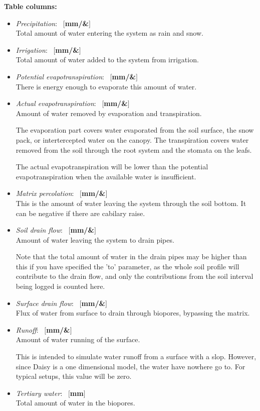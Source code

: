 \documentclass[a4paper]{article}
\begin{document}
\textbf{Table columns:}\begin{itemize}
\item \textit{Precipitation}: ~$[$\textbf{mm/\&}$]$\\
Total amount of water entering the system as rain and snow.
\item \textit{Irrigation}: ~$[$\textbf{mm/\&}$]$\\
Total amount of water added to the system from irrigation.
\item \textit{Potential evapotranspiration}: ~$[$\textbf{mm/\&}$]$\\
There is energy enough to evaporate this amount of water.
\item \textit{Actual evapotranspiration}: ~$[$\textbf{mm/\&}$]$\\
Amount of water removed by evaporation and transpiration.

The evaporation part covers water evaporated from the soil surface,
the snow pack, or intertercepted water on the canopy.  The
transpiration covers water removed from the soil through the root
system and the stomata on the leafs.

The actual evapotranspiration will be lower than the potential
evapotranspiration when the available water is insufficient.
\item \textit{Matrix percolation}: ~$[$\textbf{mm/\&}$]$\\
This is the amount of water leaving the system through the soil bottom.
It can be negative if there are cabilary raise.
\item \textit{Soil drain flow}: ~$[$\textbf{mm/\&}$]$\\
Amount of water leaving the system to drain pipes.

Note that the total amount of water in the drain pipes may be higher
than this if you have specified the 'to' parameter, as the whole soil
profile will contribute to the drain flow, and only the contributions
from the soil interval being logged is counted here.
\item \textit{Surface drain flow}: ~$[$\textbf{mm/\&}$]$\\
Flux of water from surface to drain through biopores, bypassing the matrix.
\item \textit{Runoff}: ~$[$\textbf{mm/\&}$]$\\
Amount of water running of the surface.

This is intended to simulate water runoff from a surface with a slop.
However, since Daisy is a one dimensional model, the water have
nowhere go to.  For typical setups, this value will be zero.
\item \textit{Tertiary water}: ~$[$\textbf{mm}$]$\\
Total amount of water in the biopores.


\end{itemize}
\end{document}
